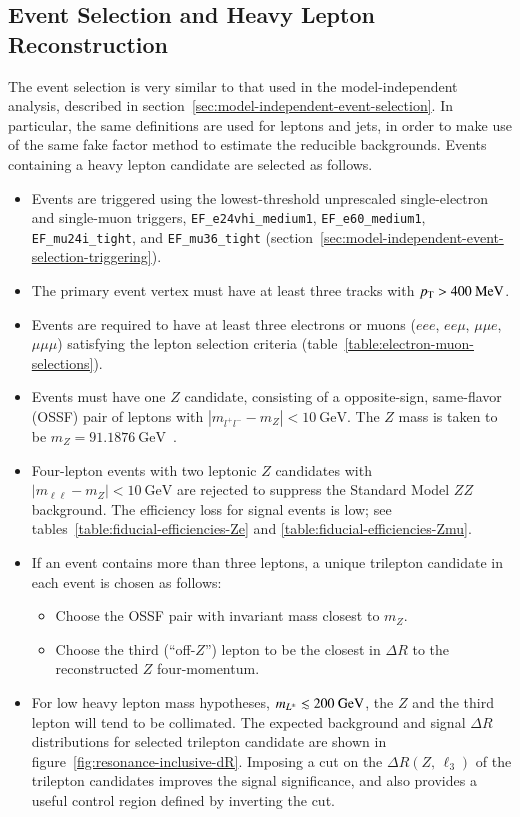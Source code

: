 \subsection{Event Selection and Heavy Lepton Reconstruction}\label{sec:event-3l-selection}
The event selection is very similar to that used in the model-independent analysis, described in section~\ref{sec:model-independent-event-selection}. In particular, the same definitions are used for leptons and jets, in order to make use of the same fake factor method to estimate the reducible backgrounds. Events containing a heavy lepton candidate are selected as follows.

\begin{itemize}
	\item Events are triggered using the lowest-threshold unprescaled single-electron and single-muon triggers, \texttt{EF\_e24vhi\_medium1}, \texttt{EF\_e60\_medium1}, \texttt{EF\_mu24i\_tight}, and \texttt{EF\_mu36\_tight} (section~\ref{sec:model-independent-event-selection-triggering}).
	\item The primary event vertex must have at least three tracks with $p_{\text{T}}>400~\mbox{MeV}$.
	\item Events are required to have at least three electrons or muons ($eee$, $ee\mu$, $\mu\mu e$, $\mu\mu\mu$) satisfying the lepton selection criteria (table~\ref{table:electron-muon-selections}). 
	\item Events must have one $Z$ candidate, consisting of a opposite-sign, same-flavor (OSSF) pair of leptons with $|m_{l^+l^-}-m_{Z}|<10~\mbox{GeV}$. The $Z$ mass is taken to be $m_Z=91.1876~\mbox{GeV}$~\cite{pdg}. 
	\item Four-lepton events with two leptonic $Z$ candidates with $|m_{\ell\ell}-m_Z|<\SI{10}{\giga\electronvolt}$ are rejected to suppress the Standard Model $ZZ$ background. The efficiency loss for signal events is low; see tables~\ref{table:fiducial-efficiencies-Ze} and \ref{table:fiducial-efficiencies-Zmu}. 
	\item If an event contains more than three leptons, a unique trilepton candidate in each event is chosen as follows:
	\begin{itemize}
		\item Choose the OSSF pair with invariant mass closest to $m_{Z}$.
		\item Choose the third (``off-$Z$'') lepton to be the closest in $\Delta R$ to the reconstructed $Z$ four-momentum.
	\end{itemize}
	\item For low heavy lepton mass hypotheses, $m_{L^{\pm}}\lesssim 200~\mbox{GeV}$, the $Z$ and the third lepton will tend to be collimated. The expected background and signal $\Delta R$ distributions for selected trilepton candidate are shown in figure~\ref{fig:resonance-inclusive-dR}. Imposing a cut on the $\Delta R(Z,\,\ell_3)$ of the trilepton candidates improves the signal significance, and also provides a useful control region defined by inverting the cut. 


\end{itemize}
